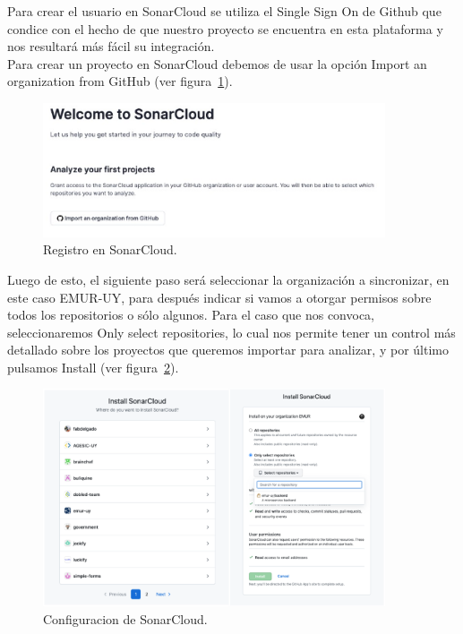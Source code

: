Para crear el usuario en SonarCloud se utiliza el Single Sign On de Github que condice con el hecho de que nuestro proyecto se encuentra en esta plataforma y nos resultará más fácil su integración.\\

Para crear un proyecto en SonarCloud debemos de usar la opción Import an organization from GitHub (ver figura~\ref{Img:Registro+en+SonarCloud}).
\begin{figure}[h]
    \centering
    \includegraphics[width=0.9\textwidth]{img/infraestructura/registro-sonarcloud.png}
    \caption{Registro en SonarCloud.} \label{Img:Registro+en+SonarCloud}
\end{figure} 

Luego de esto, el siguiente paso será seleccionar la organización a sincronizar, en este caso EMUR-UY, para después indicar si vamos a otorgar permisos sobre todos los repositorios o sólo algunos. Para el caso que nos convoca, seleccionaremos Only select repositories, lo cual nos permite tener un control más detallado sobre los proyectos que queremos importar para analizar, y por último pulsamos Install (ver figura~\ref{Img:Configuracion+de+SonarCloud}).

\begin{figure}[h]
    \centering
    \includegraphics[width=0.9\textwidth]{img/infraestructura/configurar-sonar-cloud.png}
    \caption{Configuracion de SonarCloud.} \label{Img:Configuracion+de+SonarCloud}
\end{figure} 
\newpage

